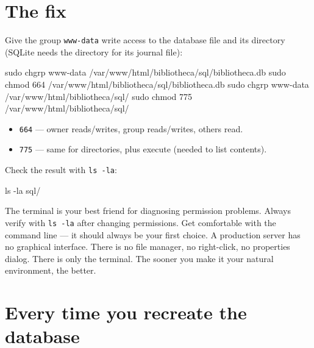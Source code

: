 \documentclass[11pt,a4paper,oneside]{book}
\newenvironment{Shaded}{\begin{snugshade}}{\end{snugshade}}
\newcommand{\FunctionTok}[1]{\textcolor[HTML]{06287E}{#1}}
\newcommand{\AttributeTok}[1]{\textcolor[HTML]{7D9029}{#1}}
\newcommand{\NormalTok}[1]{#1}
\providecommand{\tightlist}{%
  \setlength{\itemsep}{0pt}\setlength{\parskip}{0pt}}
\begin{document}
\hypertarget{the-fix}{%
\section{The fix}\label{the-fix}}

Give the group \texttt{www-data} write access to the database
file and its directory (SQLite needs the directory for its
journal file):

\begin{Shaded}
\begin{Highlighting}[]
\FunctionTok{sudo}\NormalTok{ chgrp www{-}data /var/www/html/bibliotheca/sql/bibliotheca.db}
\FunctionTok{sudo}\NormalTok{ chmod 664 /var/www/html/bibliotheca/sql/bibliotheca.db}
\FunctionTok{sudo}\NormalTok{ chgrp www{-}data /var/www/html/bibliotheca/sql/}
\FunctionTok{sudo}\NormalTok{ chmod 775 /var/www/html/bibliotheca/sql/}
\end{Highlighting}
\end{Shaded}

\begin{itemize}
\tightlist
\item
  \texttt{664} --- owner reads/writes, group reads/writes, others
  read.
\item
  \texttt{775} --- same for directories, plus execute (needed to
  list contents).
\end{itemize}

Check the result with \texttt{ls\ -la}:

\begin{Shaded}
\begin{Highlighting}[]
\FunctionTok{ls} \AttributeTok{{-}la}\NormalTok{ sql/}
\end{Highlighting}
\end{Shaded}

The terminal is your best friend for diagnosing permission
problems. Always verify with \texttt{ls\ -la} after changing
permissions. Get comfortable with the command line --- it should
always be your first choice. A production server has no graphical
interface. There is no file manager, no right-click, no
properties dialog. There is only the terminal. The sooner you
make it your natural environment, the better.

\hypertarget{every-time-you-recreate-the-database}{%
\section{Every time you recreate the
database}\label{every-time-you-recreate-the-database}}
\end{document}
